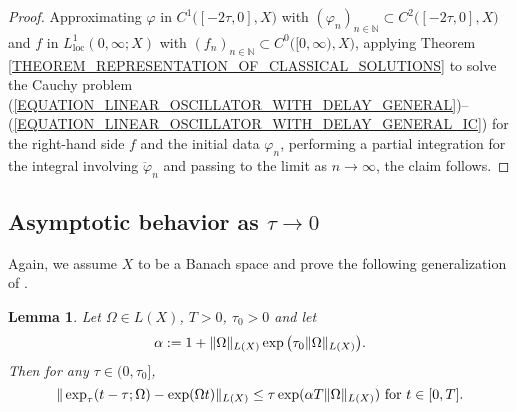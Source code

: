 \documentclass[12pt]{article}
\newtheorem{lemma}[theorem]{Lemma}
\numberwithin{equation}{section}
\numberwithin{equation}{section}
\begin{document}
	\begin{proof}
		Approximating $\varphi$ in $C^{1}\big([-2\tau, 0], X\big)$ with $(\varphi_{n})_{n \in \mathbb{N}} \subset C^{2}\big([-2\tau, 0], X\big)$ and
		$f$ in $L^{1}_{\mathrm{loc}}(0, \infty; X)$ with $(f_{n})_{n \in \mathbb{N}} \subset C^{0}\big([0, \infty), X\big)$,
		applying Theorem \ref{THEOREM_REPRESENTATION_OF_CLASSICAL_SOLUTIONS} to solve the Cauchy problem (\ref{EQUATION_LINEAR_OSCILLATOR_WITH_DELAY_GENERAL})--(\ref{EQUATION_LINEAR_OSCILLATOR_WITH_DELAY_GENERAL_IC})
		for the right-hand side $f$ and the initial data $\varphi_{n}$, performing a partial integration for the integral involving $\ddot{\varphi}_{n}$
		and passing to the limit as $n \to \infty$, the claim follows.
	\end{proof}

	\subsection{Asymptotic behavior as $\tau \to 0$}
	Again, we assume $X$ to be a Banach space and prove the following generalization of \cite[Lemma 4]{KhuPo2014}.
	\begin{lemma}
		\label{LEMMA_DELAYED_EXPONENTIAL_ASYMPTOTICS}
		Let $\Omega \in L(X)$, $T > 0$, $\tau_{0} > 0$ and let
		\begin{equation}
			\alpha := 1 + \|\Omega\|_{L(X)} \exp\big(\tau_{0} \|\Omega\|_{L(X)}\big). \notag
		\end{equation}
		Then for any $\tau \in (0, \tau_{0}]$,
		\begin{equation}
			\|\exp_{\tau}(t - \tau; \Omega) - \exp(\Omega t)\|_{L(X)} \leq \tau \exp(\alpha T \|\Omega\|_{L(X)}) \text{ for } t \in [0, T]. \notag
		\end{equation}
	\end{lemma}
\end{document}
